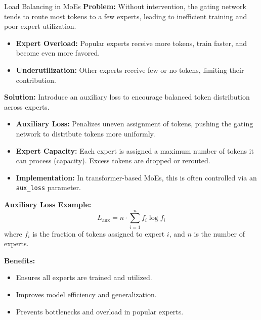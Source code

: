 \begin{frame}[allowframebreaks]{Load Balancing in MoEs}
    \textbf{Problem:} Without intervention, the gating network tends to route most tokens to a few experts, leading to inefficient training and poor expert utilization.

    \begin{itemize}
        \item \textbf{Expert Overload:} Popular experts receive more tokens, train faster, and become even more favored.
        \item \textbf{Underutilization:} Other experts receive few or no tokens, limiting their contribution.
    \end{itemize}

    \textbf{Solution:} Introduce an auxiliary loss to encourage balanced token distribution across experts.

    \begin{itemize}
        \item \textbf{Auxiliary Loss:} Penalizes uneven assignment of tokens, pushing the gating network to distribute tokens more uniformly.
        \item \textbf{Expert Capacity:} Each expert is assigned a maximum number of tokens it can process (capacity). Excess tokens are dropped or rerouted.
        \item \textbf{Implementation:} In transformer-based MoEs, this is often controlled via an \texttt{aux\_loss} parameter.
    \end{itemize}

    \textbf{Auxiliary Loss Example:}
    \[
        L_{\text{aux}} = n \cdot \sum_{i=1}^{n} f_i \log f_i
    \]
    where $f_i$ is the fraction of tokens assigned to expert $i$, and $n$ is the number of experts.

    \textbf{Benefits:}
    \begin{itemize}
        \item Ensures all experts are trained and utilized.
        \item Improves model efficiency and generalization.
        \item Prevents bottlenecks and overload in popular experts.
    \end{itemize}
\end{frame}

